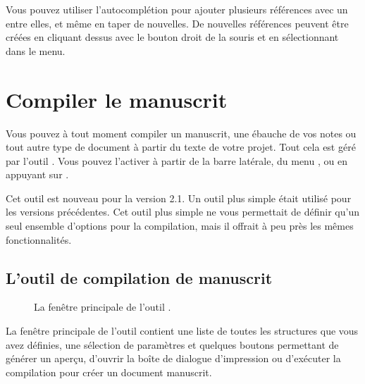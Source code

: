 \documentclass[a4paper,11pt,french]{sphinxmanual}
\begin{document}
\sphinxAtStartPar
Vous pouvez utiliser l’auto\sphinxhyphen{}complétion pour ajouter plusieurs références avec un \sphinxtitleref{,} entre elles, et même en taper de nouvelles. De nouvelles références peuvent être créées en cliquant dessus avec le bouton droit de la souris et en sélectionnant  dans le menu.

\sphinxAtStartPar
{}

\sphinxstepscope


\chapter{Compiler le manuscrit}
\label{\detokenize{project_manuscript:building-the-manuscript}}\label{\detokenize{project_manuscript:a-manuscript}}\label{\detokenize{project_manuscript::doc}}
\sphinxAtStartPar
Vous pouvez à tout moment compiler un manuscrit, une ébauche de vos notes ou tout autre type de document à partir du texte de votre projet. Tout cela est géré par l’outil . Vous pouvez l’activer à partir de la barre latérale, du menu , ou en appuyant sur .

\sphinxAtStartPar
{}Cet outil est nouveau pour la version 2.1. Un outil plus simple était utilisé pour les versions précédentes. Cet outil plus simple ne vous permettait de définir qu’un seul ensemble d’options pour la compilation, mais il offrait à peu près les mêmes fonctionnalités.


\section{L’outil de compilation de manuscrit}
\label{\detokenize{project_manuscript:the-manuscript-build-tool}}\label{\detokenize{project_manuscript:a-manuscript-main}}
\begin{figure}[htbp]
\centering
\capstart

\noindent{}
\caption{La fenêtre principale de l’outil .}\label{\detokenize{project_manuscript:id1}}\end{figure}

\sphinxAtStartPar
La fenêtre principale de l’outil  contient une liste de toutes les structures que vous avez définies, une sélection de paramètres et quelques boutons permettant de générer un aperçu, d’ouvrir la boîte de dialogue d’impression ou d’exécuter la compilation pour créer un document manuscrit.
\end{document}
